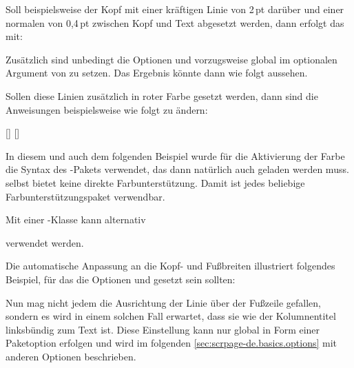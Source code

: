 \begin{Example}
  Soll beispielsweise der Kopf mit einer kräftigen Linie von 2\,pt darüber und
  einer normalen von 0,4\,pt zwischen Kopf und Text abgesetzt werden, dann
  erfolgt das mit:
\begin{lstcode}
  \setheadtopline{2pt}
  \setheadsepline{.4pt}
\end{lstcode}
Zusätzlich sind unbedingt die Optionen
 und  vorzugsweise global im
optionalen Argument von  zu setzen. Das Ergebnis könnte
dann wie folgt aussehen.
%
  \begin{XmpTopPage}
        \thinlines{}
        \thicklines{}
  \end{XmpTopPage}

  Sollen diese Linien zusätzlich in roter Farbe gesetzt werden, dann sind die
  Anweisungen beispielsweise wie folgt zu ändern:
\begin{lstcode}
  \setheadtopline{2pt}[\color{red}]
  \setheadsepline{.4pt}[\color{red}]
\end{lstcode}
  In diesem und auch dem folgenden Beispiel wurde für die Aktivierung der
  Farbe die Syntax des -Pakets verwendet,
  das dann natürlich auch geladen werden muss.  selbst
  bietet keine direkte Farbunterstützung. Damit ist jedes beliebige
  Farbunterstützungspaket verwendbar.

  Mit einer \KOMAScript-Klasse kann alternativ
\begin{lstcode}
  \setheadtopline{2pt}
  \setheadsepline{.4pt}
\end{lstcode}
  verwendet werden.

  Die automatische Anpassung an die Kopf- und Fußbreiten illustriert folgendes
  Beispiel, für das die Optionen  und 
  gesetzt sein sollten:
\begin{lstcode}
  \setfootbotline{2pt}
  \setfootsepline[text]{.4pt}
\end{lstcode}

  \label{page:scrpage-de.autoLineLength}%
  \begin{XmpBotPage}
        \thinlines{}
        \thicklines{}
  \end{XmpBotPage}
\end{Example}
%
Nun mag nicht jedem die Ausrichtung der Linie über der Fußzeile gefallen,
sondern es wird in einem solchen Fall erwartet, dass sie wie der Kolumnentitel
linksbündig zum Text ist.  Diese Einstellung kann nur global in Form einer
Paketoption erfolgen und wird im folgenden
\autoref{sec:scrpage-de.basics.options} mit anderen Optionen beschrieben.%
%
\EndIndexGroup
\EndIndexGroup


